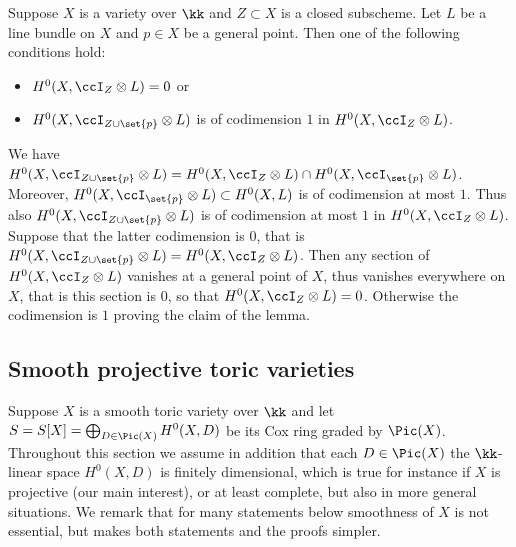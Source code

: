 \documentclass[12pt,a4paper]{article}
\begin{document}
\begin{lemma}
\label{lem_adding_one_general_point_for_single_L}
Suppose $X$ is a variety over $\kk$ and $Z\subset X$ is a closed subscheme.
Let $L$ be a line bundle on $X$ and $p\in X$ be a general point.
Then one of the following conditions hold:
\begin{itemize}
 \item  $H^0(X, \ccI_Z\otimes L) = 0$ or
 \item  $H^0(X, \ccI_{Z\cup \set{p}} \otimes L)$ is of codimension $1$ in $H^0(X, \ccI_Z\otimes L)$.
\end{itemize}
\end{lemma}
\begin{prf}
   We have $H^0(X, \ccI_{Z\cup \set{p}} \otimes L) =
   H^0(X, \ccI_{Z} \otimes L) \cap H^0(X, \ccI_{\set{p}} \otimes L)$.
   Moreover, $H^0(X, \ccI_{\set{p}} \otimes L) \subset H^0(X, L)$ is of codimension at most $1$.
   Thus also
   $H^0(X, \ccI_{Z\cup \set{p}} \otimes L)$ is of codimension at most $1$ in $H^0(X, \ccI_Z\otimes L)$.
   Suppose that the latter codimension is $0$,
   that is
   $H^0(X, \ccI_{Z\cup \set{p}} \otimes L)=H^0(X, \ccI_Z\otimes L)$.
   Then any section of $H^0(X, \ccI_Z\otimes L)$ vanishes at a general point of $X$, thus vanishes everywhere on $X$, that is this section is $0$, so that $H^0(X, \ccI_Z\otimes L)=0$.
   Otherwise the codimension is $1$ proving the claim of the lemma.
\end{prf}


\subsection{Smooth projective toric varieties}
\label{sec_toric_varieties}

Suppose $X$ is a smooth toric variety over $\kk$
   and let $S=S[X] = \bigoplus_{D\in \Pic(X)} H^0(X,D)$
   be its Cox ring graded by $\Pic(X)$.
   Throughout this section we assume in addition that each $D\in \Pic(X)$ the $\kk$-linear space $H^0(X,D)$
   is finitely dimensional, which is true for instance if $X$ is projective (our main interest), or at least complete,
   but also in more general situations.
   We remark that for many  statements below smoothness of $X$ is not essential, but makes both
    statements and the proofs simpler.
\end{document}
